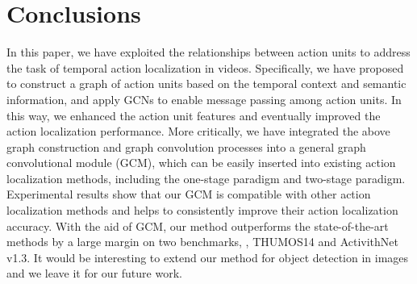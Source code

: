 \documentclass[10pt,journal,compsoc]{IEEEtran}
\begin{document}
	
	\section{Conclusions}\label{Sec:conclusion}
	
	In this paper, we have exploited the relationships between action units to address the task of temporal action localization in videos. Specifically, we have proposed to construct a graph of action units based on the temporal context and semantic information, and apply GCNs to enable message passing among action units. In this way, we enhanced the action unit features and eventually improved the action localization performance. More critically, we have integrated the above graph construction and graph convolution processes into a general graph convolutional module (GCM), which can be easily inserted into existing action localization methods, including the one-stage paradigm and two-stage paradigm. Experimental results show that our GCM is compatible  with other action localization methods and helps to consistently improve their action localization accuracy. With the aid of GCM, our method outperforms the state-of-the-art methods by a large margin on two benchmarks, \ie, THUMOS14 and ActivithNet v1.3. 
	It would be interesting to extend our method for object detection in images and we leave it for our future work.
	
	
	
	
	
	
	
\end{document}
